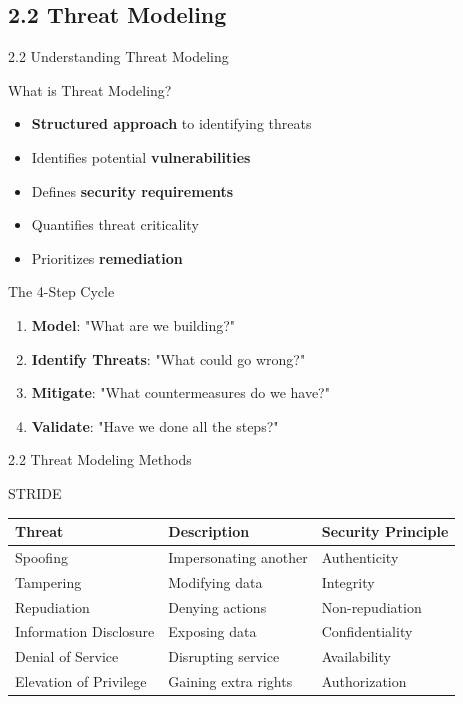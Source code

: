 \documentclass[9pt]{beamer}  %
\begin{document}
	\subsection{2.2 Threat Modeling}
	\begin{frame}{2.2 Understanding Threat Modeling}
		\begin{block}{What is Threat Modeling?}
			\begin{itemize}
				\item \textbf{Structured approach} to identifying threats
				\item Identifies potential \textbf{vulnerabilities}
				\item Defines \textbf{security requirements}
				\item Quantifies threat criticality
				\item Prioritizes \textbf{remediation}
			\end{itemize}
		\end{block}
		
		\begin{block}{The 4-Step Cycle}
			\begin{enumerate}
				\item \textbf{Model}: "What are we building?"
				\item \textbf{Identify Threats}: "What could go wrong?"
				\item \textbf{Mitigate}: "What countermeasures do we have?"
				\item \textbf{Validate}: "Have we done all the steps?"
			\end{enumerate}
		\end{block}
	\end{frame}
	
	\begin{frame}{2.2 Threat Modeling Methods}
		\begin{block}{STRIDE}
			\begin{tabular}{|p{2.5cm}|p{4cm}|p{4.5cm}|}
				\hline
				\textbf{Threat} & \textbf{Description} & \textbf{Security Principle} \\
				\hline
				Spoofing & Impersonating another & Authenticity \\
				\hline
				Tampering & Modifying data & Integrity \\
				\hline
				Repudiation & Denying actions & Non-repudiation \\
				\hline
				Information Disclosure & Exposing data & Confidentiality \\
				\hline
				Denial of Service & Disrupting service & Availability \\
				\hline
				Elevation of Privilege & Gaining extra rights & Authorization \\
				\hline
			\end{tabular}
		\end{block}
	\end{frame}
	
\end{document}
